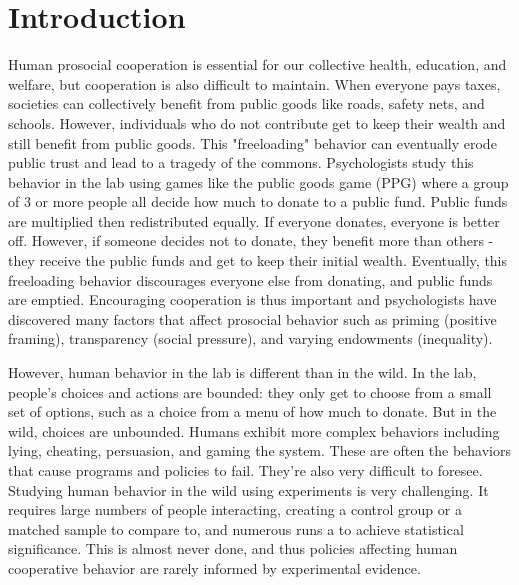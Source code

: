 \section{Introduction}

Human prosocial cooperation is essential for our collective health, education, and welfare, but cooperation is also difficult to maintain. 
When everyone pays taxes, societies can collectively benefit from public goods like roads, safety nets, and schools. However, individuals who do not contribute get to keep their wealth and still benefit from public goods. 
This "freeloading" behavior can eventually erode public trust and lead to a tragedy of the commons. 
Psychologists study this behavior in the lab using games like the public goods game (PPG) where a group of 3 or more people all decide how much to donate to a public fund. Public funds are multiplied then redistributed equally. If everyone donates, everyone is better off. However, if someone decides not to donate, they benefit more than others - they receive the public funds and get to keep their initial wealth. Eventually, this freeloading behavior discourages everyone else from donating, and public funds are emptied. 
Encouraging cooperation is thus important and psychologists have discovered many factors that affect prosocial behavior such as priming (positive framing), transparency (social pressure), and varying endowments (inequality).  

However, human behavior in the lab is different than in the wild. In the lab, people’s choices and actions are bounded: they only get to choose from a small set of options, such as a choice from a menu of how much to donate. But in the wild, choices are unbounded. Humans exhibit more complex behaviors including lying, cheating, persuasion, and gaming the system. These are often the behaviors that cause programs and policies to fail. They’re also very difficult to foresee. Studying human behavior in the wild using experiments is very challenging. It requires large numbers of people interacting, creating a control group or a matched sample to compare to, and numerous runs a to achieve statistical significance. This is almost never done, and thus policies affecting human cooperative behavior are rarely informed by experimental evidence.

